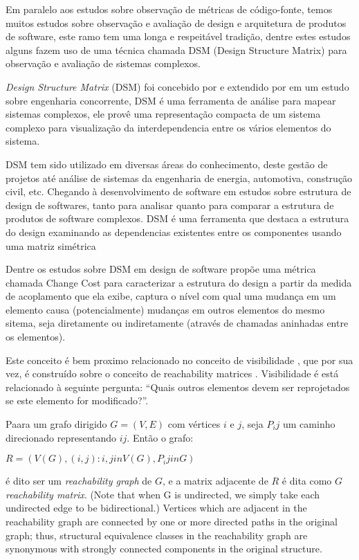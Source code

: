 Em paralelo aos estudos sobre observação de métricas de código-fonte, temos
muitos estudos sobre observação e avaliação de design e arquitetura de produtos
de software, este ramo tem uma longa e respeitável tradição, dentre estes
estudos alguns fazem uso de uma técnica chamada DSM (Design Structure Matrix)
para observação e avaliação de sistemas complexos.

{\it Design Structure Matrix} (DSM) foi concebido por 
e extendido por  em um estudo sobre engenharia
concorrente, DSM é uma ferramenta de análise para mapear sistemas complexos, ele
provê uma representação compacta de um sistema complexo para visualização da
interdependencia entre os vários elementos do sistema.

DSM tem sido utilizado em diversas áreas do conhecimento, deste gestão de
projetos \cite{Browning2016} até análise de sistemas da engenharia de energia,
automotiva, construção civil, etc. Chegando à desenvolvimento de software em
estudos sobre estrutura de design de softwares, tanto para analisar quanto para
comparar a estrutura de produtos de software complexos. DSM é uma ferramenta
que destaca a estrutura do design examinando as dependencias existentes entre
os componentes usando uma matriz simétrica \cite{Steward1981}

Dentre os estudos sobre DSM em design de software 
propõe uma métrica chamada Change Cost para caracterizar a estrutura do design
a partir da medida de acoplamento que ela exibe, captura o nível com qual uma
mudança em um elemento causa (potencialmente) mudanças em outros elementos do
mesmo sitema, seja diretamente ou indiretamente (através de chamadas aninhadas
entre os elementos).

Este conceito é bem proximo relacionado no conceito de visibilidade
\cite{Sharman2004}, que por sua vez, é construído sobre o conceito de
reachability matrices \cite{Warfield1973}. Visibilidade é está relacionado
à seguinte pergunta: ``Quais outros elementos devem ser reprojetados se
este elemento for modificado?''.

Paara um grafo dirigido $ G=(V,E) $ com vértices $ i $ e $ j $, seja $ P_ij $ um caminho direcionado representando $ ij $. Então o grafo:

$ R = ( V(G), { (i,j): i,j in V(G), P_ij in G } ) $

é dito ser um {\it reachability graph} de $ G $, e a matrix adjacente de $ R $ é dita como $ G $ {\it reachability matrix}.
(Note that when G is undirected, we simply take each undirected edge to be bidirectional.) Vertices which are adjacent in the reachability graph are connected by one or more directed paths in the original graph; thus, structural equivalence classes in the reachability graph are synonymous with strongly connected components in the original structure. 

